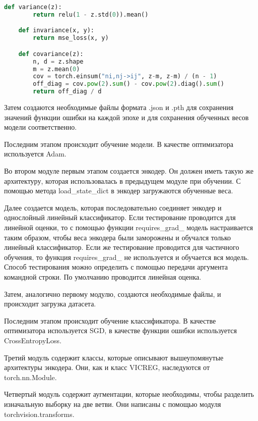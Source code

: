 \begin{lstlisting}[language=python, caption=Вычисления значений компонент функции потерь]
    def variance(z):
        return relu(1 - z.std(0)).mean()

    def invariance(x, y):
        return mse_loss(x, y)

    def covariance(z):
        n, d = z.shape
        m = z.mean(0)
        cov = torch.einsum("ni,nj->ij", z-m, z-m) / (n - 1)
        off_diag = cov.pow(2).sum() - cov.pow(2).diag().sum()
        return off_diag / d
\end{lstlisting}

Затем создаются необходимые файлы формата .json и .pth для сохранения значений функции ошибки на каждой эпохе и для сохранения обученных весов модели соответственно.

Последним этапом происходит обучение модели. В качестве оптимизатора используется Adam.

Во втором модуле первым этапом создается энкодер. Он должен иметь такую же архитектуру, которая использовалась в предыдущем модуле при обучении. С помощью метода load\_state\_dict в энкодер загружаются обученные веса. 

Далее создается модель, которая последовательно соединяет энкодер и однослойный линейный классификатор. Если тестирование проводится для линейной оценки, то с помощью функции requires\_grad\_ модель настраивается таким образом, чтобы веса энкодера были заморожены и обучался только линейный классификатор. Если же тестирование проводится для частичного обучения, то функция requires\_grad\_ не используется и обучается вся модель. Способ тестирования можно определить с помощью передачи аргумента командной строки. По умолчанию проводится линейная оценка.

Затем, аналогично первому модулю, создаются необходимые файлы, и происходит загрузка датасета.

Последним этапом происходит обучение классификатора. В качестве оптимизатора используется SGD, в качестве функции ошибки используется CrossEntropyLoss.

Третий модуль содержит классы, которые описывают вышеупомянутые архитектуры энкодера. Они, как и класс VICREG, наследуются от torch.nn.Module.

Четвертый модуль содержит аугментации, которые необходимы, чтобы разделить изначальную выборку на две ветви. Они написаны с помощью модуля torchvision.transforms.